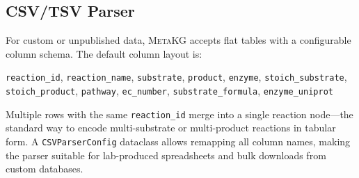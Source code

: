 \documentclass[10pt]{article}
\begin{document}
\subsection{CSV/TSV Parser}

For custom or unpublished data, \textsc{MetaKG} accepts flat tables with a
configurable column schema. The default column layout is:

\begin{center}
\small
\texttt{reaction\_id}, \texttt{reaction\_name}, \texttt{substrate},
\texttt{product}, \texttt{enzyme}, \texttt{stoich\_substrate},
\texttt{stoich\_product}, \texttt{pathway}, \texttt{ec\_number},
\texttt{substrate\_formula}, \texttt{enzyme\_uniprot}
\end{center}

Multiple rows with the same \texttt{reaction\_id} merge into a single
reaction node---the standard way to encode multi-substrate or multi-product
reactions in tabular form. A \texttt{CSVParserConfig} dataclass allows
remapping all column names, making the parser suitable for lab-produced
spreadsheets and bulk downloads from custom databases.



\end{document}
